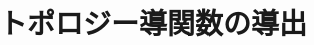 \documentclass[titlepage,a4paper,12pt,oneside,dvipdfmx]{jsbook}
\begin{document}
\chapter{トポロジー導関数の導出}




%




\end{document}
